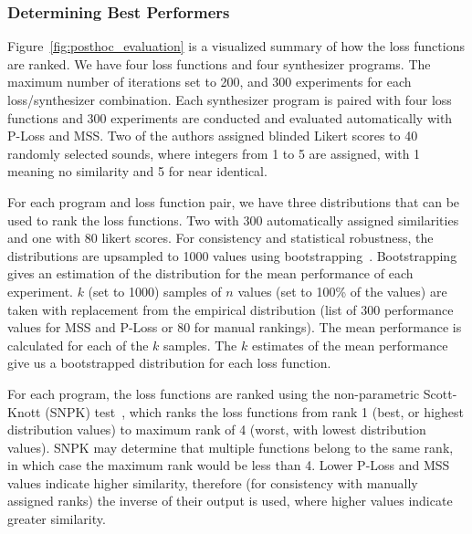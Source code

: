 \documentclass[lettersize,journal]{IEEEtran}
\providecommand{\gls}[1]{#1}
\begin{document}
\subsubsection{Determining Best Performers}
 Figure~\ref{fig:posthoc_evaluation} is a visualized summary of how the loss functions are ranked. We have four loss functions and four synthesizer programs. The maximum number of iterations set to 200, and 300 experiments for each loss/synthesizer combination. Each synthesizer program  is paired with four loss functions and 300 experiments are conducted and evaluated automatically with P-Loss and MSS. Two of the authors assigned blinded Likert scores to 40 randomly selected sounds, where integers from 1 to 5 are assigned, with 1 meaning no similarity and 5 for near identical. 

For each program and loss function pair, we have three distributions that can be used to rank the loss functions. Two with 300 automatically assigned similarities and one with 80 likert scores. For consistency and statistical robustness, the distributions are upsampled to 1000 values using bootstrapping~\cite{tibshirani1993introduction}. Bootstrapping gives an estimation of the distribution for the mean performance of each experiment. $k$ (set to 1000) samples of $n$ values (set to 100\% of the values) are taken with replacement from the empirical distribution (list of 300 performance values for MSS and P-Loss or 80 for manual rankings). The mean performance is calculated for each of the $k$ samples. The $k$ estimates of the mean performance give us a bootstrapped distribution for each loss function. 

For each program, the loss functions are ranked using the non-parametric Scott-Knott (\gls{SNPK}) test~\cite{tantithamthavorn2017mvt,tantithamthavorn2018optimization}, which ranks the loss functions from rank 1 (best, or highest distribution values) to maximum rank of 4 (worst, with lowest distribution values). SNPK may determine that multiple functions belong to the same rank, in which case the maximum rank would be less than 4. Lower P-Loss and MSS values indicate higher similarity, therefore (for consistency with manually assigned ranks) the inverse of their output is used, where higher values indicate greater similarity. 


\end{document}
